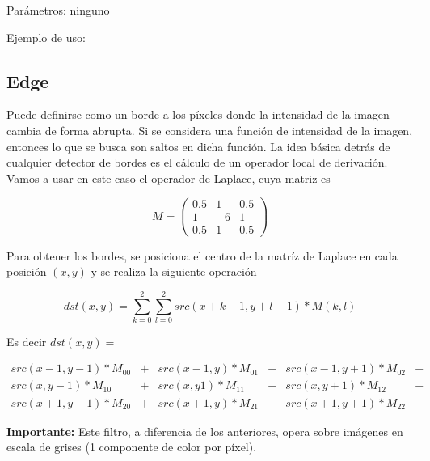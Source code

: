 \noindent Parámetros: ninguno

\noindent Ejemplo de uso: 





\subsection{Edge}

Puede definirse como un borde a los p\'ixeles donde la intensidad de la imagen cambia de forma abrupta. 
Si se considera una funci\'on de intensidad de la imagen, entonces lo que se busca son saltos en dicha funci\'on.
La idea b\'asica detr\'as de cualquier detector de bordes es el c\'alculo de un operador local de derivaci\'on. \\
 

Vamos a usar en este caso el operador de Laplace, cuya matriz es

$$ M = \left(
\begin{matrix}
    0.5 & 1 & 0.5 \\
    1 & -6 & 1 \\
    0.5 & 1 & 0.5
\end{matrix}
\right)$$


Para obtener los bordes, se posiciona el centro de la matr\'iz de 
Laplace en cada posici\'on $(x, y)$ y se realiza la siguiente operaci\'on

$$dst(x, y) = \sum_{k = 0}^2 \sum_{l = 0}^2 src(x + k - 1, y + l - 1) * M(k, l)$$

Es decir $dst(x, y) = $
\begin{center}
    $\begin{matrix}
        src(x - 1, y - 1) * M_{00} & + & src(x - 1, y) * M_{01} & + & src(x - 1, y + 1) * M_{02} & +\\
        src(x, y - 1) * M_{10} & + & src(x, y1) * M_{11} & + & src(x, y + 1) * M_{12} & +\\ 
        src(x + 1, y - 1) * M_{20} & + & src(x + 1, y) * M_{21} & + & src(x + 1, y + 1) * M_{22} &
    \end{matrix}$
\end{center}

\textbf{Importante:} Este filtro, a diferencia de los anteriores, opera sobre imágenes en escala de grises (1 componente de color por píxel).


